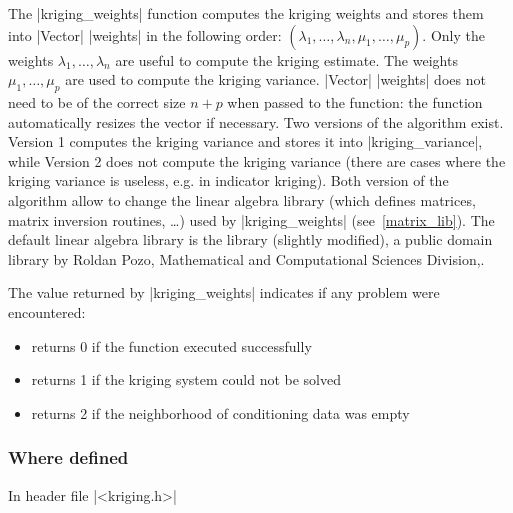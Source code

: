 \documentclass[12pt,twoside]{report}
\begin{document}
The |kriging_weights| function computes the kriging weights and stores them into |Vector| |weights| in the following order: $( \lambda_1,\ldots,\lambda_n,\mu_1,\ldots,\mu_p)$. 
Only the weights $\lambda_1,\ldots,\lambda_n$ are useful to compute the kriging estimate. The weights $\mu_1,\ldots,\mu_p$ are used to compute the kriging variance.
|Vector| |weights| does not need to be of the correct size $n+p$ when passed to the function: the function automatically resizes the vector if necessary. 
Two versions of the algorithm exist. Version 1 computes the kriging variance and stores it into |kriging_variance|, while Version 2 does not compute the kriging variance (there are cases where the kriging variance is useless, e.g. in indicator kriging).
Both version of the algorithm allow to change the linear algebra library (which defines matrices, matrix inversion routines, \ldots) used by |kriging_weights| (see~\ref{matrix_lib}). 
The default linear algebra library is the library (slightly modified), a public domain library by Roldan Pozo, Mathematical and Computational Sciences Division,.

The value returned by |kriging_weights| indicates if any problem were encountered:
\begin{itemize}
\item returns 0 if the function executed successfully
\item returns 1 if the kriging system could not be solved
\item returns 2 if the neighborhood of conditioning data was empty
\end{itemize}

\htmlrule[CLEAR=all]  \subsubsection*{Where defined}
In header file |<kriging.h>|
\end{document}
